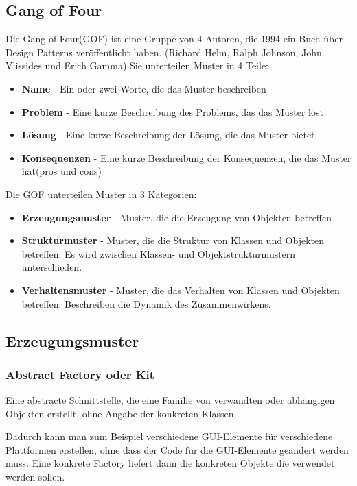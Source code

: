 \documentclass[12pt]{scrartcl}
\begin{document}
\subsection{Gang of Four}

Die Gang of Four(GOF) ist eine Gruppe von 4 Autoren, die 1994 ein Buch über Design Patterns veröffentlicht haben.
(Richard Helm, Ralph Johnson, John Vlissides und Erich Gamma) Sie unterteilen Muster in 4 Teile:
\begin{itemize}
	\item \textbf{Name} - Ein oder zwei Worte, die das Muster beschreiben
	\item \textbf{Problem} - Eine kurze Beschreibung des Problems, das das Muster löst
	\item \textbf{Lösung} - Eine kurze Beschreibung der Lösung, die das Muster bietet
	\item \textbf{Konsequenzen} - Eine kurze Beschreibung der Konsequenzen, die das Muster hat(pros und cons)
\end{itemize}

Die GOF unterteilen Muster in 3 Kategorien:
\begin{itemize}
	\item \textbf{Erzeugungsmuster} - Muster, die die Erzeugung von Objekten betreffen
	\item \textbf{Strukturmuster} - Muster, die die Struktur von Klassen und Objekten betreffen. Es wird zwischen Klassen- und Objektstrukturmustern unterschieden.
	\item \textbf{Verhaltensmuster} - Muster, die das Verhalten von Klassen und Objekten betreffen. Beschreiben die Dynamik des Zusammenwirkens.
\end{itemize}

\subsection{Erzeugungsmuster}

\subsubsection{Abstract Factory oder Kit}

Eine abstracte Schnittstelle, die eine Familie von verwandten oder abhängigen Objekten erstellt, ohne Angabe der konkreten Klassen.

Dadurch kann man zum Beispiel verschiedene GUI-Elemente für verschiedene Plattformen erstellen, ohne dass der Code
für die GUI-Elemente geändert werden muss. Eine konkrete Factory liefert dann die konkreten Objekte die verwendet werden sollen.
\end{document}

